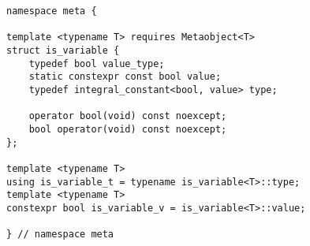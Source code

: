 
\begin{verbatim}
namespace meta {

template <typename T> requires Metaobject<T>
struct is_variable {
	typedef bool value_type;
	static constexpr const bool value;
	typedef integral_constant<bool, value> type;

	operator bool(void) const noexcept;
	bool operator(void) const noexcept;
};

template <typename T>
using is_variable_t = typename is_variable<T>::type;
template <typename T>
constexpr bool is_variable_v = is_variable<T>::value;

} // namespace meta
\end{verbatim}
